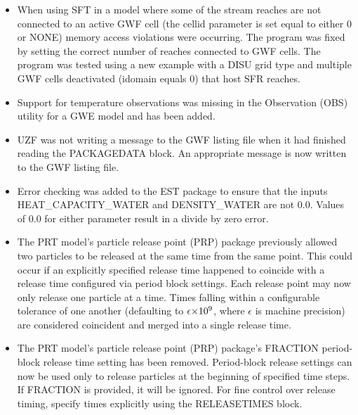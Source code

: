 \begin{itemize}
		\item When using SFT in a model where some of the stream reaches are not connected to an active GWF cell (the cellid parameter is set equal to either 0 or NONE) memory access violations were occurring.  The program was fixed by setting the correct number of reaches connected to GWF cells.  The program was tested using a new example with a DISU grid type and multiple GWF cells deactivated (idomain equals 0) that host SFR reaches.
		\item Support for temperature observations was missing in the Observation (OBS) utility for a GWE model and has been added.
		\item UZF was not writing a message to the GWF listing file when it had finished reading the PACKAGEDATA block.  An appropriate message is now written to the GWF listing file.
		\item Error checking was added to the EST package to ensure that the inputs HEAT\_CAPACITY\_WATER and DENSITY\_WATER are not 0.0.  Values of 0.0 for either parameter result in a divide by zero error.
		\item The PRT model's particle release point (PRP) package previously allowed two particles to be released at the same time from the same point. This could occur if an explicitly specified release time happened to coincide with a release time configured via period block settings. Each release point may now only release one particle at a time. Times falling within a configurable tolerance of one another (defaulting to $\sisetup{input-digits = 0123456789\epsilon} \num{\epsilon e+9}$, where $\epsilon$ is machine precision) are considered coincident and merged into a single release time.
		\item The PRT model's particle release point (PRP) package's FRACTION period-block release time setting has been removed. Period-block release settings can now be used only to release particles at the beginning of specified time steps. If FRACTION is provided, it will be ignored. For fine control over release timing, specify times explicitly using the RELEASETIMES block.
	\end{itemize}



